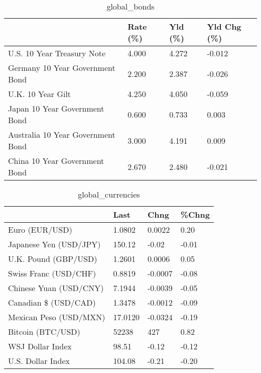 \documentclass{article}%
\begin{document}
%


\begin{table}[htbp]%
\caption{global\_bonds}%
\centering%
\begin{adjustbox}{width=1\textwidth}%
\begin{tabular}{llll}
\toprule
                                  & Rate (\%) & Yld (\%) & Yld Chg (\%) \\
\midrule
       U.S. 10 Year Treasury Note &    4.000 &   4.272 &      -0.012 \\
  Germany 10 Year Government Bond &    2.200 &   2.387 &      -0.026 \\
                U.K. 10 Year Gilt &    4.250 &   4.050 &      -0.059 \\
    Japan 10 Year Government Bond &    0.600 &   0.733 &       0.003 \\
Australia 10 Year Government Bond &    3.000 &   4.191 &       0.009 \\
    China 10 Year Government Bond &    2.670 &   2.480 &      -0.021 \\
\bottomrule
\end{tabular}
%
\end{adjustbox}%
\end{table}

%


\begin{table}[htbp]%
\caption{global\_currencies}%
\centering%
\begin{adjustbox}{width=1\textwidth}%
\begin{tabular}{llll}
\toprule
                       &    Last &    Chng & \%Chng \\
\midrule
        Euro (EUR/USD) &  1.0802 &  0.0022 &  0.20 \\
Japanese Yen (USD/JPY) &  150.12 &   -0.02 & -0.01 \\
  U.K. Pound (GBP/USD) &  1.2601 &  0.0006 &  0.05 \\
 Swiss Franc (USD/CHF) &  0.8819 & -0.0007 & -0.08 \\
Chinese Yuan (USD/CNY) &  7.1944 & -0.0039 & -0.05 \\
  Canadian \$ (USD/CAD) &  1.3478 & -0.0012 & -0.09 \\
Mexican Peso (USD/MXN) & 17.0120 & -0.0324 & -0.19 \\
     Bitcoin (BTC/USD) &   52238 &     427 &  0.82 \\
      WSJ Dollar Index &   98.51 &   -0.12 & -0.12 \\
     U.S. Dollar Index &  104.08 &   -0.21 & -0.20 \\
\bottomrule
\end{tabular}
%
\end{adjustbox}%
\end{table}
\end{document}

